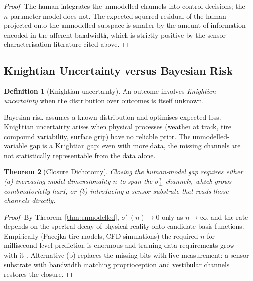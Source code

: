\documentclass[11pt,twocolumn]{article}
\newtheorem{theorem}{Theorem}
\theoremstyle{definition}
\newtheorem{definition}[theorem]{Definition}
\theoremstyle{remark}
\begin{document}
\begin{proof}
The human integrates the unmodelled channels into control decisions; the $n$-parameter model does not. The expected squared residual of the human projected onto the unmodelled subspace is smaller by the amount of information encoded in the afferent bandwidth, which is strictly positive by the sensor-characterisation literature cited above.
\end{proof}

\subsection{Knightian Uncertainty versus Bayesian Risk}

\begin{definition}[Knightian uncertainty]\label{def:knight}
An outcome involves \emph{Knightian uncertainty} \cite{knight1921risk,savage1972foundations,kay2020radical} when the distribution over outcomes is itself unknown.
\end{definition}

Bayesian risk assumes a known distribution and optimises expected loss. Knightian uncertainty arises when physical processes (weather at track, tire compound variability, surface grip) have no reliable prior. The unmodelled-variable gap is a Knightian gap: even with more data, the missing channels are not statistically representable from the data alone.

\begin{theorem}[Closure Dichotomy]\label{thm:closure}
Closing the human-model gap requires either (a) increasing model dimensionality $n$ to span the $\sigma^2_{\perp}$ channels, which grows combinatorially hard, or (b) introducing a sensor substrate that reads those channels directly.
\end{theorem}

\begin{proof}
By Theorem~\ref{thm:unmodelled}, $\sigma^2_{\perp}(n) \to 0$ only as $n \to \infty$, and the rate depends on the spectral decay of physical reality onto candidate basis functions. Empirically (Pacejka tire models, CFD simulations) the required $n$ for millisecond-level prediction is enormous and training data requirements grow with it \cite{pacejka2012tyre,katz2006aerodynamics}. Alternative (b) replaces the missing bits with live measurement: a sensor substrate with bandwidth matching proprioception and vestibular channels restores the closure.
\end{proof}
\end{document}
